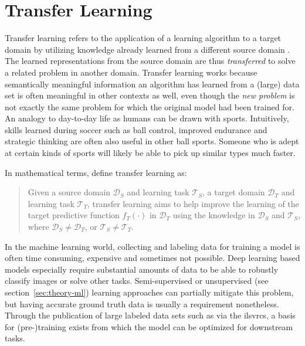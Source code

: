\documentclass[draft,final]{vutinfth} %
\begin{document}
\section{Transfer Learning}
\label{sec:background-transfer-learning}

Transfer learning refers to the application of a learning algorithm to
a target domain by utilizing knowledge already learned from a
different source domain \cite{zhuang2021}. The learned representations
from the source domain are thus \emph{transferred} to solve a related
problem in another domain. Transfer learning works because
semantically meaningful information an algorithm has learned from a
(large) data set is often meaningful in other contexts as well, even
though the \emph{new problem} is not exactly the same problem for
which the original model had been trained for. An analogy to
day-to-day life as humans can be drawn with sports. Intuitively,
skills learned during soccer such as ball control, improved endurance
and strategic thinking are often also useful in other ball
sports. Someone who is adept at certain kinds of sports will likely be
able to pick up similar types much faster.

In mathematical terms, \textcite{pan2010} define transfer learning as:

\begin{quote}{\cite[p.1347]{pan2010}}
  Given a source domain $\mathcal{D}_{S}$ and learning task
  $\mathcal{T}_{S}$, a target domain $\mathcal{D}_{T}$ and learning task
  $\mathcal{T}_{T}$, transfer learning aims to help improve the learning of the
  target predictive function $f_{T}(\cdot)$ in $\mathcal{D}_{T}$ using the knowledge
  in $\mathcal{D}_{S}$ and $\mathcal{T}_{S}$, where $\mathcal{D}_{S}\neq\mathcal{D}_{T}$, or $\mathcal{T}_{S}\neq\mathcal{T}_{T}$.
\end{quote}

In the machine learning world, collecting and labeling data for
training a model is often time consuming, expensive and sometimes not
possible. Deep learning based models especially require substantial
amounts of data to be able to robustly classify images or solve other
tasks. Semi-supervised or unsupervised (see
section~\ref{sec:theory-ml}) learning approaches can partially
mitigate this problem, but having accurate ground truth data is
usually a requirement nonetheless. Through the publication of large
labeled data sets such as via the \glspl{ilsvrc}, a basis for
(pre-)training exists from which the model can be optimized for
downstream tasks.
\end{document}
